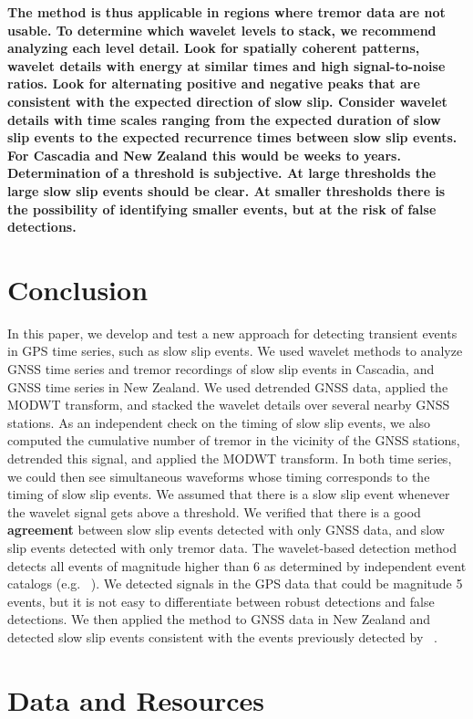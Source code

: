 \documentclass{article}
\begin{document}
\textbf{The method is thus applicable in regions where tremor data are not usable. To determine which wavelet levels to stack, we recommend analyzing each level detail. Look for spatially coherent patterns, wavelet details with energy at similar times and high signal-to-noise ratios. Look for alternating positive and negative peaks that are consistent with the expected direction of slow slip. Consider wavelet details with time scales ranging from the expected duration of slow slip events to the expected recurrence times between slow slip events. For Cascadia and New Zealand this would be weeks to years. Determination of a threshold is subjective. At large thresholds the large slow slip events should be clear. At smaller thresholds there is the possibility of identifying smaller events, but at the risk of false detections.}

\section{Conclusion}

In this paper, we develop and test a new approach for detecting transient events in GPS time series, such as slow slip events. We used wavelet methods to analyze GNSS time series and tremor recordings of slow slip events in Cascadia, and GNSS time series in New Zealand. We used detrended GNSS data, applied the MODWT transform, and stacked the wavelet details over several nearby GNSS stations. As an independent check on the timing of slow slip events, we also computed the cumulative number of tremor in the vicinity of the GNSS stations, detrended this signal, and applied the MODWT transform. In both time series, we could then see simultaneous waveforms whose timing corresponds to the timing of slow slip events. We assumed that there is a slow slip event whenever the wavelet signal gets above a threshold. We verified that there is a good \textbf{agreement} between slow slip events detected with only GNSS data, and slow slip events detected with only tremor data. The wavelet-based detection method detects all events of magnitude higher than 6 as determined by independent event catalogs (e.g. ~\citep{MIC_2019}). We detected signals in the GPS data that could be magnitude 5 events, but it is not easy to differentiate between robust detections and false detections. We then applied the method to GNSS data in New Zealand and detected slow slip events consistent with the events previously detected by ~\citet{TOD_2016}.

\section*{Data and Resources}
\end{document}
